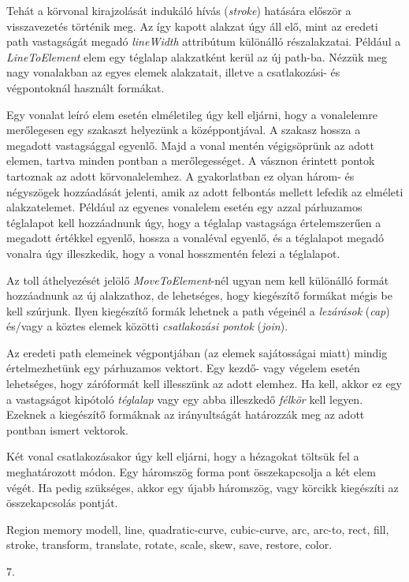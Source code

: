 \documentclass[12pt]{report}
\theoremstyle{definition}
\newcommand{\inenglish}[1]{\textsl{#1}}
\newcommand{\func}[1]{{\textsl{#1}}}
\begin{document}
Tehát a körvonal kirajzolását indukáló hívás (\emph{stroke}) hatására először a
visszavezetés történik meg. Az így kapott alakzat úgy áll elő, mint az eredeti
path vastagságát megadó \func{lineWidth} attribútum különálló részalakzatai.
Például a \func{LineToElement} elem egy téglalap alakzatként kerül az új
path-ba. Nézzük meg nagy vonalakban az egyes elemek alakzatait, illetve a
csatlakozási- és végpontoknál használt formákat.

Egy vonalat leíró elem esetén elméletileg úgy kell eljárni, hogy a vonalelemre
merőlegesen egy szakaszt helyezünk a középpontjával. A szakasz hossza a
megadott vastagsággal egyenlő. Majd a vonal mentén végigsöprünk az adott
elemen, tartva minden pontban a merőlegességet. A vásznon érintett pontok
tartoznak az adott körvonalelemhez. A gyakorlatban ez olyan három- és
négyszögek hozzáadását jelenti, amik az adott felbontás mellett lefedik az
elméleti alakzatelemet.  Például az egyenes vonalelem esetén egy azzal
párhuzamos téglalapot kell hozzáadnunk úgy, hogy a téglalap vastagsága
értelemszerűen a megadott értékkel egyenlő, hossza a vonaléval egyenlő, és a
téglalapot megadó vonalra úgy illeszkedik, hogy a vonal hosszmentén felezi a
téglalapot.

Az toll áthelyezését jelölő \func{MoveToElement}-nél ugyan nem kell különálló
formát hozzáadnunk az új alakzathoz, de lehetséges, hogy kiegészítő formákat
mégis be kell szúrjunk. Ilyen kiegészítő formák lehetnek a path végeinél a
\emph{lezárások} (\inenglish{cap}) és/vagy a köztes elemek közötti
\emph{csatlakozási pontok} (\inenglish{join}).

Az eredeti path elemeinek végpontjában (az elemek sajátosságai miatt) mindig
értelmezhetünk egy párhuzamos vektort. Egy kezdő- vagy végelem esetén
lehetséges, hogy záróformát kell illesszünk az adott elemhez. Ha kell, akkor ez
egy a vastagságot kipótoló \emph{téglalap} vagy egy abba illeszkedő
\emph{félkör} kell legyen. Ezeknek a kiegészítő formáknak az irányultságát
határozzák meg az adott pontban ismert vektorok.

Két vonal csatlakozásakor úgy kell eljárni, hogy a hézagokat töltsük fel a
meghatározott módon. Egy háromszög forma pont összekapcsolja a két elem végét.
Ha pedig szükséges, akkor egy újabb háromszög, vagy körcikk kiegészíti az
összekapcsolás pontját.

  \begin{description}[noitemsep]
    \item[Kulcsszavak] Region memory modell, line, quadratic-curve,
    cubic-curve, arc, arc-to, rect, fill, stroke, transform, translate, rotate,
    scale, skew, save, restore, color.
    \item[Becsült oldalszám] 7.
  \end{description}
\end{document}
